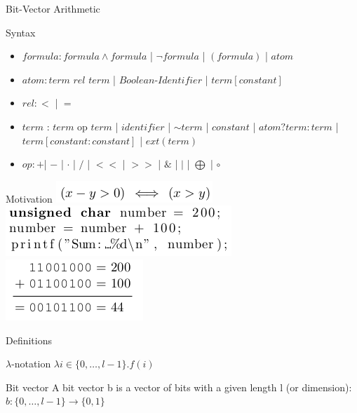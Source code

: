 \documentclass{beamer}
\begin{document}
\begin{frame}{Bit-Vector Arithmetic}
\begin{block}{Syntax}
\begin{itemize}
\item $formula: formula \wedge formula$ | $\lnot formula$ | $(formula)$ | $atom$
\item $atom : term$ $rel$ $term$ | $Boolean$-$Identifier$ | $term[constant]$
\item $rel : <$ | $=$
\item $term$ : $term$ op $term$ | $identifier$ | $\sim term$ | $constant$ | $atom?term:term$ | $term[constant : constant]$ | $ext(term)$
\item $op : + $| $-$ | $\cdot$ | $/$ | $<<$ | $>>$ | $\&$ | $|$ | $\bigoplus$ | $\circ$
\end{itemize}
\end{block}
\end{frame}

\begin{frame}{Motivation}
\includegraphics[scale=0.5]{mot1.png}\newline
\includegraphics[scale=0.5]{mot2.png}\newline
\includegraphics[scale=0.5]{mot3.png}
\end{frame}

\begin{frame}{Definitions}
\begin{block}{$\lambda$-notation}
$\lambda i \in \{0, \dots, l - 1\}.f(i)$
\end{block}
\begin{block}{Bit vector}
A bit vector b is a vector of bits with a given length l (or dimension):\newline
$b : \{0, \dots, l - 1\} \rightarrow \{0, 1\}$
\end{block}
\end{frame}
\end{document}

